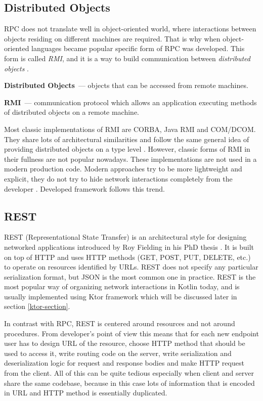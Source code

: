 \documentclass[a4paper,11pt,oneside]{article}
\newcommand{\term}[1]{\textit{#1}}
\newcommand{\makedefinition}[3][]{\textbf{#2}\ifthenelse{\equal{#1}{}}{}{~(#1)}~--- #3.}
\begin{document}
\subsection{Distributed Objects}

RPC does not translate well in object-oriented world, where interactions between objects residing
on different machines are required. That is why when object-oriented languages became popular
specific form of RPC was developed. This form is called \term{RMI}, and it is a way to build
communication between \term{distributed objects} \cite{wollrath_distributed_1996} \cite{tanenbaum_distributed_2006}.

\makedefinition{Distributed Objects}{objects that can be accessed from remote machines}

\makedefinition[remote method invocation]{RMI}{communication protocol which allows an application
executing methods of distributed objects on a remote machine}

Most classic implementations of RMI are CORBA, Java RMI \cite{noauthor_java_nodate} and
COM/DCOM. They share lots of architectural similarities and follow the same general idea of providing
distributed objects on a type level \cite{plasil_architectural_1998}. However, classic forms of RMI in
their fullness are not popular nowadays. These implementations are not used in a modern production
code. Modern approaches try to be more lightweight and explicit, they do not try to hide network
interactions completely from the developer \cite{ryan_grpc_2015}. Developed framework follows this 
trend.

\subsection{REST}

REST (Representational State Transfer) is an architectural style for designing networked
applications introduced by Roy Fielding in his PhD thesis \cite{fielding_architectural_2000}. It
is built on top of HTTP and uses HTTP methods (GET, POST, PUT, DELETE, etc.) to operate on
resources identified by URLs. REST does not specify any particular serialization format, but JSON
is the most common one in practice. REST is the most popular way of organizing network
interactions in Kotlin today, and is usually implemented using Ktor framework
\cite{noauthor_ktor_nodate} which will be discussed later in section \ref{ktor-section}.

In contrast with RPC, REST is centered around resources and not around procedures. From
developer's point of view this means that for each new endpoint user has to design URL of the
resource, choose HTTP method that should be used to access it, write routing code on the server,
write serialization and deserialization logic for request and response bodies and make HTTP
request from the client. All of this can be quite tedious especially when client and server share
the same codebase, because in this case lots of information that is encoded in URL and HTTP method
is essentially duplicated.
\end{document}
